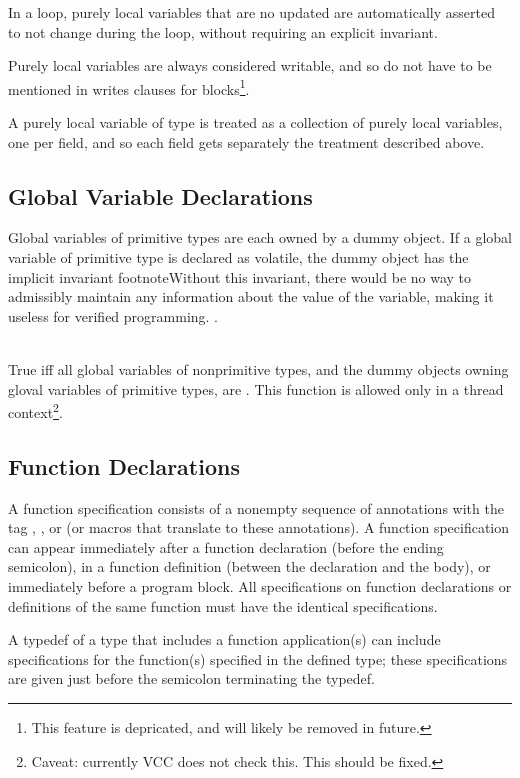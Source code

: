 \documentclass[preprint,nocopyrightspace]{sigplanconf}
\begin{document}
{{{{\begin{VCC}
In a loop, purely local variables that are no updated are
automatically asserted to not change during the loop, without
requiring an explicit invariant.

Purely local variables are always considered writable, and so do not
have to be mentioned in writes clauses for blocks\footnote{This
feature is depricated, and will likely be removed in future.}. 


A purely local variable of  type is treated
as a collection of purely local variables, one per field, and so each
field gets separately the treatment described above.

\subsection{Global Variable Declarations}
Global variables of primitive types are each owned by a dummy
object. If a global variable  of primitive type is declared as
volatile, the dummy object has the implicit invariant
footnote{Without this invariant, there would be no way to admissibly
maintain any information about the value of the variable, making it
useless for verified programming.
}.

\\
True iff all global variables of nonprimitive types, and the dummy
objects owning gloval variables of primitive types,
are \vcc{\mutable}. This function is allowed only in a thread
context\footnote{
Caveat: currently VCC does not check this. This should be fixed.
}.


\subsection{Function Declarations}
A function specification consists of a nonempty sequence of
annotations with the tag , ,
or  (or macros that translate to these annotations). A
function specification can appear immediately after a function
declaration (before the ending semicolon), in a function definition
(between the declaration and the body), or immediately before a
program block. All specifications on function declarations or
definitions of the same function must have the identical
specifications.

A typedef of a type that includes a function application(s) can include
specifications for the function(s) specified in the defined type;
these specifications are given just before the semicolon terminating
the typedef.


\end{VCC}}}}}
\end{document}
